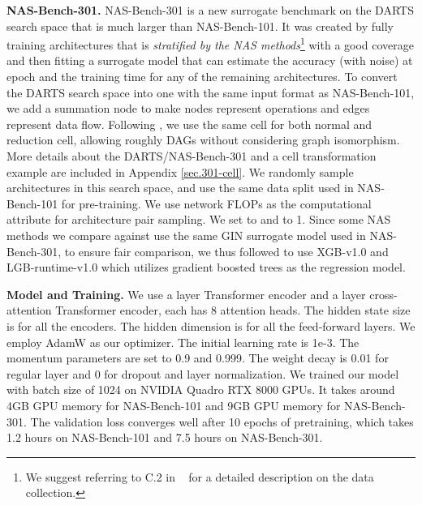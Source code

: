 \textbf{NAS-Bench-301.}
NAS-Bench-301 \cite{julien2020nas301} is a new surrogate benchmark on the DARTS \cite{liu2018darts} search space that is much larger than NAS-Bench-101. It 
was created by fully training  architectures that is \emph{stratified by the NAS methods}\footnote{We suggest referring to C.2 in ~\citep{julien2020nas301} for a detailed description on the data collection.} with a good coverage and then fitting a surrogate model that can estimate the accuracy (with noise) at epoch  and the training time for any of the remaining  architectures.
To convert the DARTS search space into one with the same input format as NAS-Bench-101, we add a summation node to make nodes represent operations and edges represent data flow. Following \cite{liu2018progressive}, we use the same cell for both normal and reduction cell, allowing roughly  DAGs without considering graph isomorphism. More details about the DARTS/NAS-Bench-301 and a cell transformation example are included in Appendix \ref{sec.301-cell}. 
We randomly sample  architectures in this search space, and use the same data split used in NAS-Bench-101 for pre-training. We use network FLOPs as the computational attribute  for architecture pair sampling. We set  to  and  to 1. Since some NAS methods we compare against use the same GIN \cite{xu2018how} surrogate model used in NAS-Bench-301, to ensure fair comparison, we thus followed \cite{julien2020nas301} to use XGB-v1.0 and LGB-runtime-v1.0 which utilizes gradient boosted trees \cite{Chen:2016:XST:2939672.2939785,NIPS2017_6449f44a} as the regression model. 

\textbf{Model and Training.}
We use a  layer Transformer encoder and a  layer cross-attention Transformer encoder, each has 8 attention heads. The hidden state size is  for all the encoders. The hidden dimension is  for all the feed-forward layers.
We employ AdamW \cite{loshchilov2017decoupled} as our optimizer.
The initial learning rate is 1e-3.
The momentum parameters are set to 0.9 and 0.999.
The weight decay is 0.01 for regular layer and 0 for dropout and layer normalization.
We trained our model with batch size of 1024 on NVIDIA Quadro RTX 8000 GPUs. It takes around 4GB GPU memory for NAS-Bench-101 and 9GB GPU memory for NAS-Bench-301. The validation loss converges well after 10 epochs of pretraining, which takes 1.2 hours on NAS-Bench-101 and 7.5 hours on NAS-Bench-301. 

